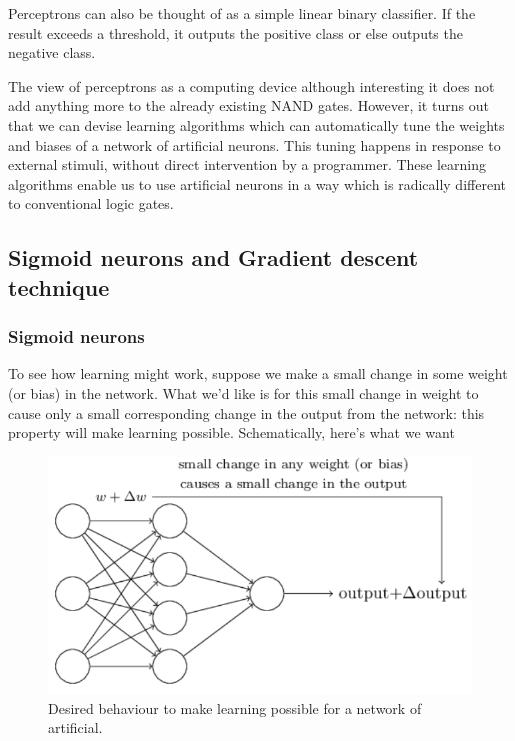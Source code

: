 \documentclass[12pt, letterpaper]{article}
\theoremstyle{definition}
\begin{document}
Perceptrons can also be thought of as a simple linear binary classifier. If the result exceeds a threshold, it outputs the positive class or else outputs the negative class. 

The view of perceptrons as a computing device although interesting it does not add anything more to the already existing NAND gates. However, it turns out that we can devise learning algorithms which can automatically tune the weights and biases of a network of artificial neurons. This tuning happens in response to external stimuli, without direct intervention by a programmer. These learning algorithms enable us to use artificial neurons in a way which is radically different to conventional logic gates.
\subsection{Sigmoid neurons and Gradient descent technique}
\subsubsection{Sigmoid neurons}
To see how learning might work, suppose we make a small change in some weight (or bias) in the network. What we'd like is for this small change in weight to cause only a small corresponding change in the output from the network: this property will make learning possible. Schematically, here's what we want
\begin{figure}
\centering
\includegraphics[scale=0.4]{img/NNdeltaChange}
\caption{Desired behaviour to make learning possible for a network of artificial.}
\label{NNdeltaChange}
\end{figure}
\end{document}
